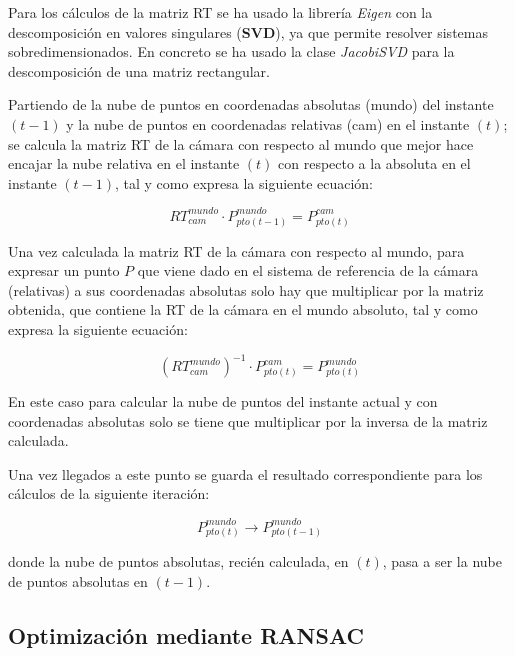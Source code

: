 Para los cálculos de la matriz RT se ha usado la librería \textit{Eigen} con la descomposición en valores singulares (\textbf{SVD}), ya que permite resolver sistemas sobredimensionados. En concreto se ha usado la clase \textit{JacobiSVD} para la descomposición de una matriz rectangular.

Partiendo de la nube de puntos en coordenadas absolutas (mundo) del instante $(t-1)$ y la nube de puntos en coordenadas relativas (cam) en el instante $(t)$; se calcula la matriz RT de la cámara con respecto al mundo que mejor hace encajar la nube relativa en el instante $(t)$ con respecto a la absoluta en el instante $(t-1)$, tal y como expresa la siguiente ecuación:


\begin{equation}
RT_{cam}^{mundo}\cdot P_{pto(t-1)}^{mundo}=P_{pto(t)}^{cam}
\end{equation}

Una vez calculada la matriz RT de la cámara con respecto al mundo, para expresar un punto $P$ que viene dado en el sistema de referencia de la cámara (relativas) a sus coordenadas absolutas solo hay que multiplicar por la matriz obtenida, que contiene la RT de la cámara en el mundo absoluto, tal y como expresa la siguiente ecuación:

\begin{equation}
\left(RT_{cam}^{mundo}\right)^{-1}\cdot P_{pto(t)}^{cam}=P_{pto(t)}^{mundo}
\end{equation}

En este caso para calcular la nube de puntos del instante actual y con coordenadas absolutas solo se tiene que multiplicar por la inversa de la matriz calculada.

Una vez llegados a este punto se guarda el resultado correspondiente para los cálculos de la siguiente iteración:

\begin{equation}
P_{pto(t)}^{mundo}\longrightarrow P_{pto(t-1)}^{mundo}
\end{equation}

donde la nube de puntos absolutas, recién calculada, en $(t)$, pasa a ser la nube de puntos absolutas en $(t-1)$.
\subsection{Optimización mediante RANSAC}

